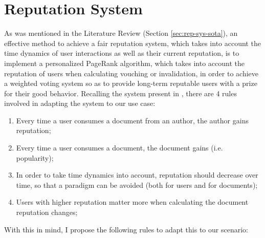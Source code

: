 \section{Reputation System} \label{sec:problem-solution-rep-sys}
As was mentioned in the Literature Review (Section \ref{sec:rep-sys-sota}), an effective method to achieve a fair reputation system, which takes into account the time dynamics of user interactions as well as their current reputation, is to implement a personalized PageRank algorithm, which takes into account the reputation of users when calculating vouching or invalidation, in order to achieve a weighted voting system so as to provide long-term reputable users with a prize for their good behavior. Recalling the system present in \cite{Daly2009}, there are 4 rules involved in adapting the system to our use case:

\begin{enumerate}
    \item Every time a user consumes a document from an author, the author gains reputation;
    \item Every time a user consumes a document, the document gains  (i.e. popularity);
    \item In order to take time dynamics into account, reputation should decrease over time, so that a  paradigm can be avoided (both for users and for documents);
    \item Users with higher reputation matter more when calculating the document reputation changes;
\end{enumerate}

With this in mind, I propose the following rules to adapt this to our scenario:

